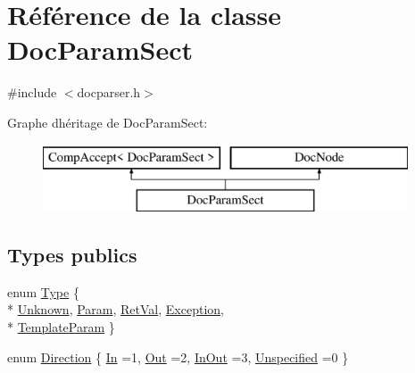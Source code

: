 \hypertarget{class_doc_param_sect}{}\section{Référence de la classe Doc\+Param\+Sect}
\label{class_doc_param_sect}


{\ttfamily \#include $<$docparser.\+h$>$}

Graphe d\textquotesingle{}héritage de Doc\+Param\+Sect\+:\begin{figure}[H]
\begin{center}
\leavevmode
\includegraphics[height=2.000000cm]{class_doc_param_sect}
\end{center}
\end{figure}
\subsection*{Types publics}
\begin{DoxyCompactItemize}
\item 
enum \hyperlink{class_doc_param_sect_a402e8723e8b9f22c5ffa84046224d51a}{Type} \{ \\*
\hyperlink{class_doc_param_sect_a402e8723e8b9f22c5ffa84046224d51aaceeaf36c7f8e7c3a4e47a68453fd130e}{Unknown}, 
\hyperlink{class_doc_param_sect_a402e8723e8b9f22c5ffa84046224d51aadd6d8ac7d3bbca9c02eeaf0667dc898d}{Param}, 
\hyperlink{class_doc_param_sect_a402e8723e8b9f22c5ffa84046224d51aad057fa7d7e908eb6f2aab26e1c9cd7ca}{Ret\+Val}, 
\hyperlink{class_doc_param_sect_a402e8723e8b9f22c5ffa84046224d51aab35f5129b2fc6fa21358b0d1f1e8ac48}{Exception}, 
\\*
\hyperlink{class_doc_param_sect_a402e8723e8b9f22c5ffa84046224d51aa171c52c00ef0e893e8622dcf37db20e0}{Template\+Param}
 \}
\item 
enum \hyperlink{class_doc_param_sect_ad5e3f053f03f8c333a69208521075c66}{Direction} \{ \hyperlink{class_doc_param_sect_ad5e3f053f03f8c333a69208521075c66a91340ac3497abe40521ff1032d14f260}{In} =1, 
\hyperlink{class_doc_param_sect_ad5e3f053f03f8c333a69208521075c66a6f4ea16fe4731fee90a5ed69933b34e5}{Out} =2, 
\hyperlink{class_doc_param_sect_ad5e3f053f03f8c333a69208521075c66aa67a43fd4af2659272f549f379472ff6}{In\+Out} =3, 
\hyperlink{class_doc_param_sect_ad5e3f053f03f8c333a69208521075c66ab10385814739b43cf57af1d841b821c5}{Unspecified} =0
 \}
\end{DoxyCompactItemize}
